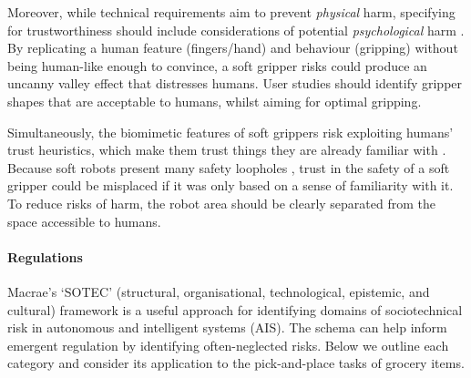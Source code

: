 \documentclass[lettersize,journal]{IEEEtran}
\begin{document}
Moreover, while technical requirements aim to prevent \emph{physical} harm, specifying for trustworthiness should include considerations of potential \emph{psychological} harm \cite{Porter2022}. By replicating a human feature (fingers/hand) and behaviour (gripping) without being human-like enough to convince, a soft gripper risks could produce an uncanny valley effect \cite{moore2012bayesian} that distresses humans. User studies should identify gripper shapes that are acceptable to humans, whilst aiming for optimal gripping.  
	
 
Simultaneously, the biomimetic features of soft grippers risk exploiting humans’ trust heuristics, which make them trust things they are already familiar with \cite{Manzini}. Because soft robots present many safety loopholes \cite{abidi2017intrinsic}, trust in the safety of a soft gripper could be misplaced if it was only based on a sense of familiarity with it. To reduce risks of harm, the robot area should be clearly separated from the space accessible to humans.

\paragraph{Regulations}\label{regulation}

Macrae’s \cite{Macrae2022} ‘SOTEC’ (structural, organisational, technological, epistemic, and cultural) framework is a useful approach for identifying domains of sociotechnical risk in autonomous and intelligent systems (AIS). The schema can help inform emergent regulation by identifying often-neglected risks. Below we outline each category and consider its application to the pick-and-place tasks of grocery items.
\end{document}
